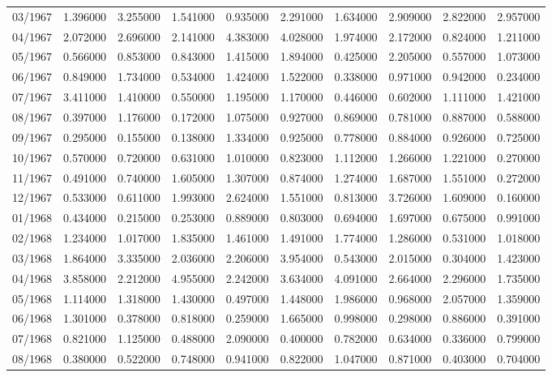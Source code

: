 \begin{tabular}{lrrrrrrrrr}
03/1967 & 1.396000 & 3.255000 & 1.541000 & 0.935000 & 2.291000 & 1.634000 & 2.909000 & 2.822000 & 2.957000 \\
04/1967 & 2.072000 & 2.696000 & 2.141000 & 4.383000 & 4.028000 & 1.974000 & 2.172000 & 0.824000 & 1.211000 \\
05/1967 & 0.566000 & 0.853000 & 0.843000 & 1.415000 & 1.894000 & 0.425000 & 2.205000 & 0.557000 & 1.073000 \\
06/1967 & 0.849000 & 1.734000 & 0.534000 & 1.424000 & 1.522000 & 0.338000 & 0.971000 & 0.942000 & 0.234000 \\
07/1967 & 3.411000 & 1.410000 & 0.550000 & 1.195000 & 1.170000 & 0.446000 & 0.602000 & 1.111000 & 1.421000 \\
08/1967 & 0.397000 & 1.176000 & 0.172000 & 1.075000 & 0.927000 & 0.869000 & 0.781000 & 0.887000 & 0.588000 \\
09/1967 & 0.295000 & 0.155000 & 0.138000 & 1.334000 & 0.925000 & 0.778000 & 0.884000 & 0.926000 & 0.725000 \\
10/1967 & 0.570000 & 0.720000 & 0.631000 & 1.010000 & 0.823000 & 1.112000 & 1.266000 & 1.221000 & 0.270000 \\
11/1967 & 0.491000 & 0.740000 & 1.605000 & 1.307000 & 0.874000 & 1.274000 & 1.687000 & 1.551000 & 0.272000 \\
12/1967 & 0.533000 & 0.611000 & 1.993000 & 2.624000 & 1.551000 & 0.813000 & 3.726000 & 1.609000 & 0.160000 \\
01/1968 & 0.434000 & 0.215000 & 0.253000 & 0.889000 & 0.803000 & 0.694000 & 1.697000 & 0.675000 & 0.991000 \\
02/1968 & 1.234000 & 1.017000 & 1.835000 & 1.461000 & 1.491000 & 1.774000 & 1.286000 & 0.531000 & 1.018000 \\
03/1968 & 1.864000 & 3.335000 & 2.036000 & 2.206000 & 3.954000 & 0.543000 & 2.015000 & 0.304000 & 1.423000 \\
04/1968 & 3.858000 & 2.212000 & 4.955000 & 2.242000 & 3.634000 & 4.091000 & 2.664000 & 2.296000 & 1.735000 \\
05/1968 & 1.114000 & 1.318000 & 1.430000 & 0.497000 & 1.448000 & 1.986000 & 0.968000 & 2.057000 & 1.359000 \\
06/1968 & 1.301000 & 0.378000 & 0.818000 & 0.259000 & 1.665000 & 0.998000 & 0.298000 & 0.886000 & 0.391000 \\
07/1968 & 0.821000 & 1.125000 & 0.488000 & 2.090000 & 0.400000 & 0.782000 & 0.634000 & 0.336000 & 0.799000 \\
08/1968 & 0.380000 & 0.522000 & 0.748000 & 0.941000 & 0.822000 & 1.047000 & 0.871000 & 0.403000 & 0.704000 \\

\end{tabular}
